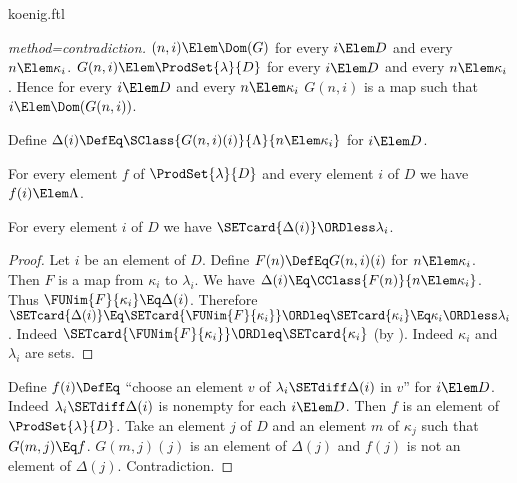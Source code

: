 \documentclass{stex}
\begin{document}
\begin{smodule}{koenig.ftl}
\begin{forthel}
\begin{proof}[method=contradiction]
    $(n,i) \Elem \Dom(G)$ for every $i \Elem D$ and every $n \Elem \kappa_{i}$.
    $G(n,i) \Elem \ProdSet{\lambda}{D}$ for every $i \Elem D$ and every $n \Elem \kappa_{i}$.
    Hence for every $i \Elem D$ and every $n \Elem \kappa_{i}$ $G(n,i)$ is a map such that $i \Elem \Dom(G(n,i))$.

    Define $\Delta(i) \DefEq \SClass{G(n,i)(i)}{\Lambda}{n \Elem \kappa_{i}}$ for $i \Elem D$.

    For every element $f$ of $\ProdSet{\lambda}{D}$ and every element $i$ of $D$ we have $f(i) \Elem \Lambda$.

    For every element $i$ of $D$ we have $\SETcard{\Delta(i)} \ORDless \lambda_{i}$.
    \begin{proof}
      Let $i$ be an element of $D$.
      Define $F(n) \DefEq G(n,i)(i)$ for $n \Elem \kappa_{i}$.
      Then $F$ is a map from $\kappa_{i}$ to $\lambda_{i}$.
      We have $\Delta(i) \Eq \CClass{F(n)}{n \Elem \kappa_{i}}$.
      Thus $\FUNim{F}{\kappa_{i}} \Eq \Delta(i)$.
      Therefore $\SETcard{\Delta(i)}
        \Eq \SETcard{\FUNim{F}{\kappa_{i}}}
        \ORDleq \SETcard{\kappa_{i}}
        \Eq \kappa_{i}
        \ORDless \lambda_{i}$.
      Indeed $\SETcard{\FUNim{F}{\kappa_{i}}} \ORDleq \SETcard{\kappa_{i}}$ (by ).
      Indeed $\kappa_{i}$ and $\lambda_{i}$ are sets.
    \end{proof}

    Define $f(i) \DefEq$ ``choose an element $v$ of $\lambda_{i} \SETdiff \Delta(i)$ in $v$'' for $i \Elem D$.
    Indeed $\lambda_{i} \SETdiff \Delta(i)$ is nonempty for each $i \Elem D$.
    Then $f$ is an element of $\ProdSet{\lambda}{D}$.
    Take an element $j$ of $D$ and an element $m$ of $\kappa_{j}$ such that $G(m,j) \Eq f$.
    $G(m,j)(j)$ is an element of $\Delta(j)$ and $f(j)$ is not an element of $\Delta(j)$.
    Contradiction.
  \end{proof}
\end{forthel}

\printbibliography
{}
\end{smodule}
\end{document}
